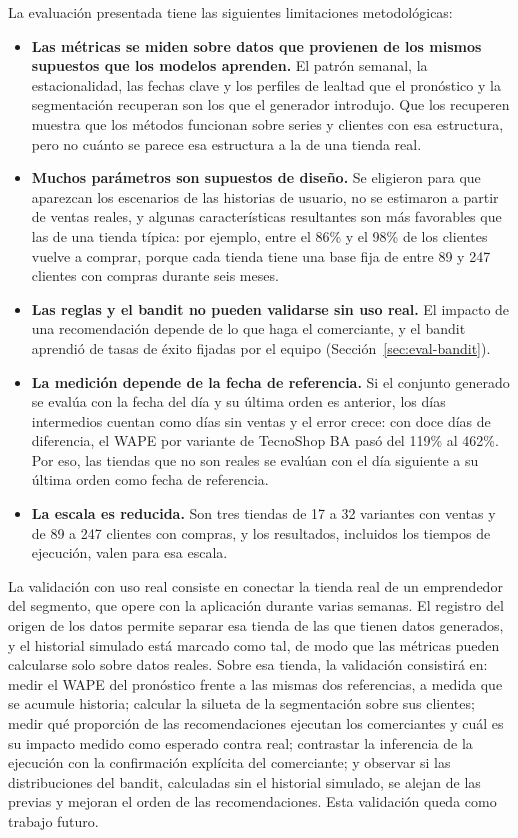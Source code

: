 La evaluación presentada tiene las siguientes limitaciones metodológicas:

\begin{itemize}
    \item \textbf{Las métricas se miden sobre datos que provienen de los mismos supuestos que los modelos aprenden.} El patrón semanal, la estacionalidad, las fechas clave y los perfiles de lealtad que el pronóstico y la segmentación recuperan son los que el generador introdujo. Que los recuperen muestra que los métodos funcionan sobre series y clientes con esa estructura, pero no cuánto se parece esa estructura a la de una tienda real.
    \item \textbf{Muchos parámetros son supuestos de diseño.} Se eligieron para que aparezcan los escenarios de las historias de usuario, no se estimaron a partir de ventas reales, y algunas características resultantes son más favorables que las de una tienda típica: por ejemplo, entre el 86\% y el 98\% de los clientes vuelve a comprar, porque cada tienda tiene una base fija de entre 89 y 247 clientes con compras durante seis meses.
    \item \textbf{Las reglas y el bandit no pueden validarse sin uso real.} El impacto de una recomendación depende de lo que haga el comerciante, y el bandit aprendió de tasas de éxito fijadas por el equipo (Sección~\ref{sec:eval-bandit}).
    \item \textbf{La medición depende de la fecha de referencia.} Si el conjunto generado se evalúa con la fecha del día y su última orden es anterior, los días intermedios cuentan como días sin ventas y el error crece: con doce días de diferencia, el WAPE por variante de TecnoShop BA pasó del 119\% al 462\%. Por eso, las tiendas que no son reales se evalúan con el día siguiente a su última orden como fecha de referencia.
    \item \textbf{La escala es reducida.} Son tres tiendas de 17 a 32 variantes con ventas y de 89 a 247 clientes con compras, y los resultados, incluidos los tiempos de ejecución, valen para esa escala.
\end{itemize}

La validación con uso real consiste en conectar la tienda real de un emprendedor del segmento, que opere con la aplicación durante varias semanas. El registro del origen de los datos permite separar esa tienda de las que tienen datos generados, y el historial simulado está marcado como tal, de modo que las métricas pueden calcularse solo sobre datos reales. Sobre esa tienda, la validación consistirá en: medir el WAPE del pronóstico frente a las mismas dos referencias, a medida que se acumule historia; calcular la silueta de la segmentación sobre sus clientes; medir qué proporción de las recomendaciones ejecutan los comerciantes y cuál es su impacto medido como esperado contra real; contrastar la inferencia de la ejecución con la confirmación explícita del comerciante; y observar si las distribuciones del bandit, calculadas sin el historial simulado, se alejan de las previas y mejoran el orden de las recomendaciones. Esta validación queda como trabajo futuro.

